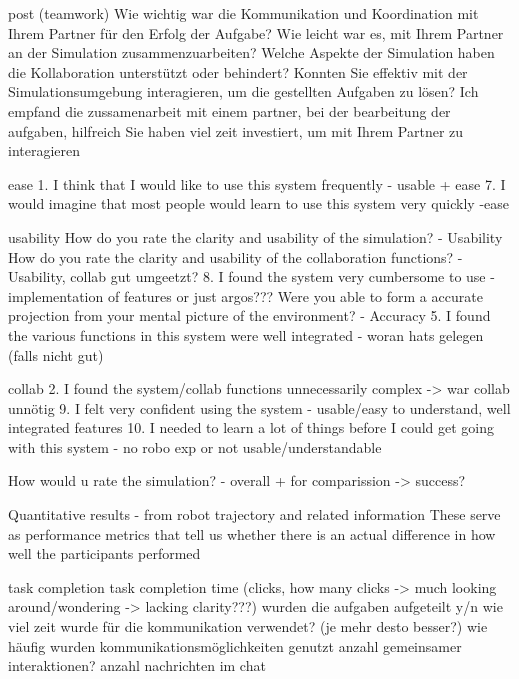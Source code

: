 \documentclass[german,version-2020-11]{uzl-thesis}
\begin{document}
  
    post
      (teamwork)
      Wie wichtig war die Kommunikation und Koordination mit Ihrem Partner für den Erfolg der Aufgabe?
      Wie leicht war es, mit Ihrem Partner an der Simulation zusammenzuarbeiten?
      Welche Aspekte der Simulation haben die Kollaboration unterstützt oder behindert?
      Konnten Sie effektiv mit der Simulationsumgebung interagieren, um die gestellten Aufgaben zu lösen?
      Ich empfand die zussamenarbeit mit einem partner, bei der bearbeitung der  aufgaben, hilfreich
      Sie haben viel zeit investiert, um mit Ihrem Partner zu interagieren

      ease
      1. I think that I would like to use this system frequently - usable + ease
      7. I would imagine that most people would learn to use this system very quickly -ease

      usability
      How do you rate the clarity and usability of the simulation? - Usability
      How do you rate the clarity and usability of the collaboration functions? - Usability, collab gut umgeetzt?
      8. I found the system very cumbersome to use - implementation of features or just argos???
      Were you able to form a accurate projection from your mental picture of the environment? - Accuracy
      5. I found the various functions in this system were well integrated - woran hats gelegen (falls nicht gut)
      
      collab
      2. I found the system/collab functions unnecessarily complex -> war collab unnötig
      9. I felt very confident using the system - usable/easy to understand, well integrated features
      10. I needed to learn a lot of things before I could get going with this system - no robo exp or not usable/understandable
    
      
      How would u rate the simulation? - overall + for comparission -> success? 


        
        
Quantitative results - from robot trajectory and related information 
  These serve as performance metrics that tell us whether there is an actual difference in how well the participants performed

        task completion  
        task completion time
        (clicks, how many clicks -> much looking around/wondering -> lacking clarity???)
        wurden die aufgaben aufgeteilt y/n
        wie viel zeit wurde für die kommunikation verwendet? (je mehr desto besser?)
        wie häufig wurden kommunikationsmöglichkeiten genutzt
        anzahl gemeinsamer interaktionen? anzahl nachrichten im chat
\end{document}
